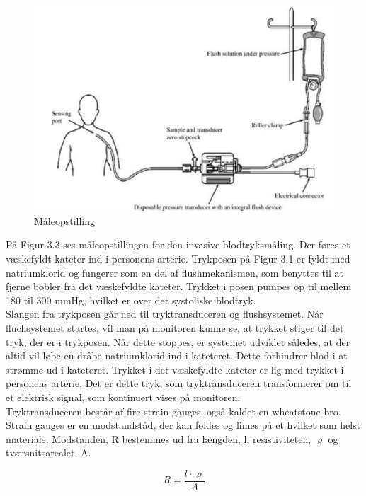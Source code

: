 \begin{figure}[H]
	\centering
	\includegraphics[width=1\textwidth]{Figurer/Snip20151207_50}
	\caption{Måleopstilling}
\end{figure}

På Figur 3.3 ses måleopstillingen for den invasive blodtryksmåling. Der føres et væskefyldt kateter ind i personens arterie. Trykposen på Figur 3.1 er fyldt med natriumklorid og fungerer som en del af flushmekanismen, som benyttes til at fjerne bobler fra det væskefyldte kateter. Trykket i posen pumpes op til mellem 180 til 300 mmHg, hvilket er over det systoliske blodtryk. \\
Slangen fra trykposen går ned til tryktransduceren og flushsystemet. Når fluchsystemet startes, vil man på monitoren kunne se, at trykket stiger til det tryk, der er i trykposen. Når dette stoppes, er systemet udviklet således, at der altid vil løbe en dråbe natriumklorid ind i kateteret. Dette forhindrer blod i at strømme ud i kateteret. Trykket i det væskefyldte kateter er lig med trykket i personens arterie. Det er dette tryk, som tryktransduceren transformerer om til et elektrisk signal, som kontinuert vises på monitoren. \\
Tryktransduceren består af fire strain gauges, også kaldet en wheatstone bro. Strain gauges er en modstandståd, der kan foldes og limes på et hvilket som helst materiale. Modstanden, R bestemmes ud fra længden, l, resistiviteten, $\varrho$ og tværsnitsarealet, A. 

\begin{equation}
	R = \frac{l \cdot \varrho}{A}
\end{equation}

